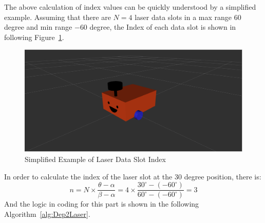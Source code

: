 The above calculation of index values can be quickly understood by a simplified example. 
Assuming that there are $N=4$ laser data slots in a max range $60$ degree and min range $-60$ degree, 
the Index of each data slot is shown in following Figure~\ref{fig:laser_index}.
\begin{figure}[H]
    \centering
    \includegraphics[width=0.8\linewidth]{figs/robot.png}
    \caption{Simplified Example of Laser Data Slot Index}
    \label{fig:laser_index}
\end{figure}
In order to calculate the index of the laser slot at the 30 degree position, there is: 
\begin{equation*}
    n=N\times\frac{\theta-\alpha}{\beta-\alpha}=4\times\frac{30^\circ-(-60^\circ)}{60^\circ-(-60^\circ) }=3
\end{equation*}
And the logic in coding for this part is shown in the following Algorithm~\ref{alg:Dep2Laser}.
